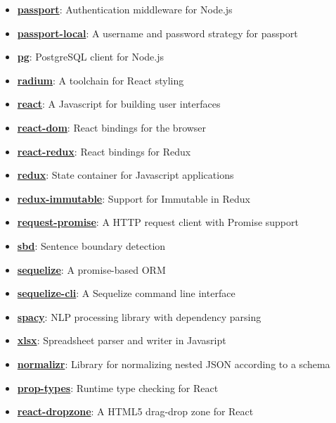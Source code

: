 \begin{itemize}
  \item \href{http://passportjs.org/}{\textbf{passport}}: Authentication middleware for Node.js
  \item \href{https://github.com/jaredhanson/passport-local}{\textbf{passport-local}}: A username and password strategy for passport
  \item \href{https://github.com/brianc/node-postgres}{\textbf{pg}}: PostgreSQL client for Node.js
  \item \href{https://github.com/FormidableLabs/radium}{\textbf{radium}}: A toolchain for React styling
  \item \href{https://facebook.github.io/react/}{\textbf{react}}: A Javascript for building user interfaces
  \item \href{https://facebook.github.io/react/docs/react-dom.html}{\textbf{react-dom}}: React bindings for the browser
  \item \href{https://github.com/reactjs/react-redux}{\textbf{react-redux}}: React bindings for Redux
  \item \href{http://redux.js.org/}{\textbf{redux}}: State container for Javascript applications
  \item \href{https://github.com/gajus/redux-immutable}{\textbf{redux-immutable}}: Support for Immutable in Redux
  \item \href{https://github.com/request/request-promise}{\textbf{request-promise}}: A HTTP request client with Promise support
  \item \href{https://github.com/Tessmore/sbd}{\textbf{sbd}}: Sentence boundary detection
  \item \href{http://docs.sequelizejs.com/en/v3/}{\textbf{sequelize}}: A promise-based ORM
  \item \href{https://github.com/sequelize/cli}{\textbf{sequelize-cli}}: A Sequelize command line interface
  \item \href{https://spacy.io/}{\textbf{spacy}}: NLP processing library with dependency parsing
  \item \href{https://github.com/SheetJS/js-xlsx}{\textbf{xlsx}}: Spreadsheet parser and writer in Javasript
  \item \href{https://github.com/paularmstrong/normalizr}{\textbf{normalizr}}: Library for normalizing nested JSON according to a schema
  \item \href{https://github.com/reactjs/prop-types}{\textbf{prop-types}}: Runtime type checking for React
  \item \href{https://github.com/okonet/react-dropzone}{\textbf{react-dropzone}}: A HTML5 drag-drop zone for React

\end{itemize}

